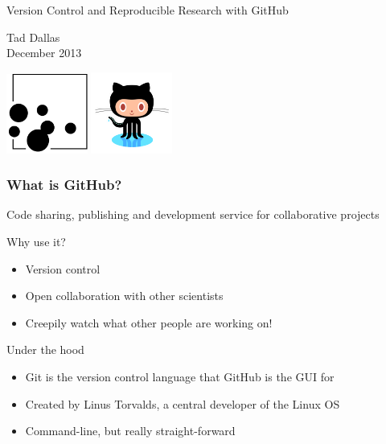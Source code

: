 \documentclass{beamer}\usepackage{graphicx, color}
\begin{document}
\begin{frame}
\LARGE
Version Control and Reproducible Research with GitHub \\
\begin{center}
\vspace{2cm}
Tad Dallas \\
December 2013 \\
\end{center}
\includegraphics[width=0.2\textwidth]{ceesglogo.png}
\hfill \includegraphics[width=0.2\textwidth]{github-logo.png}
\end{frame}



\begin{frame}
 \frametitle{What is GitHub?}

Code sharing, publishing and development service for collaborative projects

\begin{exampleblock}{Why use it?}
 \begin{itemize}
  \item Version control 
  \item Open collaboration with other scientists
  \item Creepily watch what other people are working on!
 \end{itemize}
\end{exampleblock}

\pause
\begin{block}{Under the hood}
 \begin{itemize}
  \item Git is the version control language that GitHub is the GUI for
  \item Created by Linus Torvalds, a central developer of the Linux OS 
  \item Command-line, but really straight-forward
 \end{itemize}
\end{block}
\end{frame}
\end{document}
